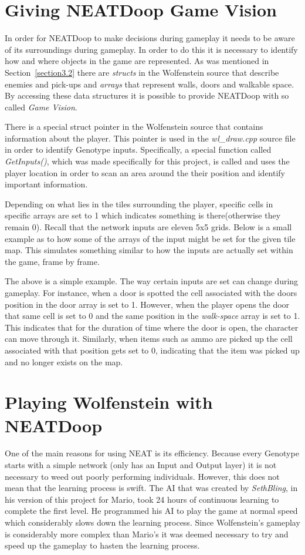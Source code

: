 \documentclass[]{Learning-to-Play-Wolfenstein-thesis}
\begin{document}
\section{Giving NEATDoop Game Vision}
In order for NEATDoop to make decisions during gameplay it needs to be aware of its surroundings during gameplay. In order to do this it is necessary to identify how and where objects in the game are represented. As was mentioned in Section~\ref{section3.2} there are \textit{structs} in the Wolfenstein source that describe enemies and pick-ups and \textit{arrays} that represent walls, doors and walkable space. By accessing these data structures it is possible to provide NEATDoop with so called \textit{Game Vision}.

There is a special struct pointer in the Wolfenstein source that contains information about the player. This pointer is used in the \textit{wl\_draw.cpp} source file in order to identify Genotype inputs. Specifically, a special function called \textit{GetInputs()}, which was made specifically for this project, is called and uses the player location in order to scan an area around the their position and identify important information. 

Depending on what lies in the tiles surrounding the player, specific cells in specific arrays are set to 1 which indicates something is there(otherwise they remain 0). Recall that the network inputs are eleven 5x5 grids. Below is a small example as to how some of the arrays of the input might be set for the given tile map. This simulates something similar to how the inputs are actually set within the game, frame by frame.

The above is a simple example. The way certain inputs are set can change during gameplay. For instance, when a door is spotted the cell associated with the doors position in the door array is set to 1. However, when the player opens the door that same cell is set to 0 and the same position in the \textit{walk-space} array is set to 1. This indicates that for the duration of time where the door is open, the character can move through it. Similarly, when items such as ammo are picked up the cell associated with that position gets set to 0, indicating that the item was picked up and no longer exists on the map.

\section{Playing Wolfenstein with NEATDoop}	%
One of the main reasons for using NEAT is its efficiency. Because every Genotype starts with a simple network (only has an Input and Output layer) it is not necessary to weed out poorly performing individuals. However, this does not mean that the learning process is swift. The AI that was created by \textit{SethBling}, in his version of this project for Mario, took 24 hours of continuous learning to complete the first level. He programmed his AI to play the game at normal speed which considerably slows down the learning process. Since Wolfenstein's gameplay is considerably more complex than Mario's it was deemed necessary to try and speed up the gameplay to hasten the learning process.
\end{document}
